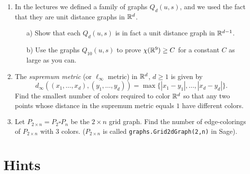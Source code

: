 \begin{enumerate}
\item In the lectures we defined a family of graphs $Q_d(u,s)$, and we used the fact that they are unit distance graphs in $\mathbb{R}^d$. 
\begin{itemize}
\item[a)] Show that each $Q_d(u,s)$ is in fact a unit distance graph in $\mathbb{R}^{d-1}$. 
\item[b)] Use the graphs $Q_{10}(u,s)$ to prove $\chi(\mathbb{R}^9)\geq C$ for a constant $C$ as large as you can. 
\end{itemize}


\item The \emph{supremum metric} (or $\ell_\infty$ metric) in $\mathbb{R}^d$, $d\geq 1$ is given by
$$d_\infty((x_1,\ldots,x_d),(y_1,\ldots,y_d))=\max\{|x_1-y_1|,\ldots,|x_d-y_d|\}.$$
Find the smallest number of colors required to color $\mathbb{R}^d$ so that any two points whose distance in the supremum metric equals $1$ have different colors.


\item Let $P_{2\times n}=P_2\square P_n$ be the $2\times n$ grid graph. Find the number of edge-colorings of $P_{2\times n}$ with $3$ colors. ($P_{2\times n}$ is called \texttt{graphs.Grid2dGraph(2,n)} in Sage).
\end{enumerate}


\section{Hints}

